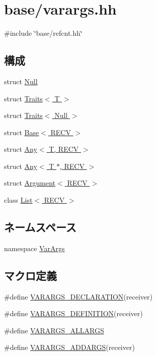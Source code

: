 \hypertarget{varargs_8hh}{
\section{base/varargs.hh}
\label{varargs_8hh}
}
{\ttfamily \#include \char`\"{}base/refcnt.hh\char`\"{}}\par
\subsection*{構成}
\begin{DoxyCompactItemize}
\item 
struct \hyperlink{structVarArgs_1_1Null}{Null}
\item 
struct \hyperlink{structVarArgs_1_1Traits}{Traits$<$ T $>$}
\item 
struct \hyperlink{structVarArgs_1_1Traits_3_01Null_01_4}{Traits$<$ Null $>$}
\item 
struct \hyperlink{structVarArgs_1_1Base}{Base$<$ RECV $>$}
\item 
struct \hyperlink{structVarArgs_1_1Any}{Any$<$ T, RECV $>$}
\item 
struct \hyperlink{structVarArgs_1_1Any_3_01T_01_5_00_01RECV_01_4}{Any$<$ T $\ast$, RECV $>$}
\item 
struct \hyperlink{structVarArgs_1_1Argument}{Argument$<$ RECV $>$}
\item 
class \hyperlink{classVarArgs_1_1List}{List$<$ RECV $>$}
\end{DoxyCompactItemize}
\subsection*{ネームスペース}
\begin{DoxyCompactItemize}
\item 
namespace \hyperlink{namespaceVarArgs}{VarArgs}
\end{DoxyCompactItemize}
\subsection*{マクロ定義}
\begin{DoxyCompactItemize}
\item 
\#define \hyperlink{varargs_8hh_a623088d039aed38ff1750f460985d8a8}{VARARGS\_\-DECLARATION}(receiver)
\item 
\#define \hyperlink{varargs_8hh_a6fac18ef6eec218a6a657001dd34df92}{VARARGS\_\-DEFINITION}(receiver)
\item 
\#define \hyperlink{varargs_8hh_a77c8bd4f485f65e3fdfe6358e1126194}{VARARGS\_\-ALLARGS}
\item 
\#define \hyperlink{varargs_8hh_a85027d5bcf96636d47f8efae3328670e}{VARARGS\_\-ADDARGS}(receiver)
\end{DoxyCompactItemize}


